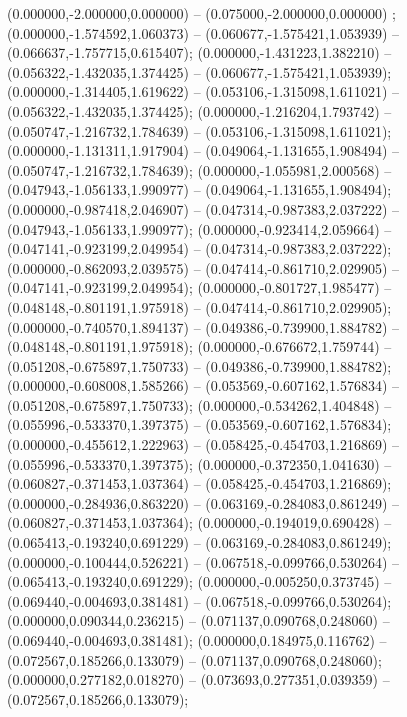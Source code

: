  (0.000000,-2.000000,0.000000) -- (0.075000,-2.000000,0.000000) ;
 (0.000000,-1.574592,1.060373) -- (0.060677,-1.575421,1.053939) -- (0.066637,-1.757715,0.615407);
 (0.000000,-1.431223,1.382210) -- (0.056322,-1.432035,1.374425) -- (0.060677,-1.575421,1.053939);
 (0.000000,-1.314405,1.619622) -- (0.053106,-1.315098,1.611021) -- (0.056322,-1.432035,1.374425);
 (0.000000,-1.216204,1.793742) -- (0.050747,-1.216732,1.784639) -- (0.053106,-1.315098,1.611021);
 (0.000000,-1.131311,1.917904) -- (0.049064,-1.131655,1.908494) -- (0.050747,-1.216732,1.784639);
 (0.000000,-1.055981,2.000568) -- (0.047943,-1.056133,1.990977) -- (0.049064,-1.131655,1.908494);
 (0.000000,-0.987418,2.046907) -- (0.047314,-0.987383,2.037222) -- (0.047943,-1.056133,1.990977);
 (0.000000,-0.923414,2.059664) -- (0.047141,-0.923199,2.049954) -- (0.047314,-0.987383,2.037222);
 (0.000000,-0.862093,2.039575) -- (0.047414,-0.861710,2.029905) -- (0.047141,-0.923199,2.049954);
 (0.000000,-0.801727,1.985477) -- (0.048148,-0.801191,1.975918) -- (0.047414,-0.861710,2.029905);
 (0.000000,-0.740570,1.894137) -- (0.049386,-0.739900,1.884782) -- (0.048148,-0.801191,1.975918);
 (0.000000,-0.676672,1.759744) -- (0.051208,-0.675897,1.750733) -- (0.049386,-0.739900,1.884782);
 (0.000000,-0.608008,1.585266) -- (0.053569,-0.607162,1.576834) -- (0.051208,-0.675897,1.750733);
 (0.000000,-0.534262,1.404848) -- (0.055996,-0.533370,1.397375) -- (0.053569,-0.607162,1.576834);
 (0.000000,-0.455612,1.222963) -- (0.058425,-0.454703,1.216869) -- (0.055996,-0.533370,1.397375);
 (0.000000,-0.372350,1.041630) -- (0.060827,-0.371453,1.037364) -- (0.058425,-0.454703,1.216869);
 (0.000000,-0.284936,0.863220) -- (0.063169,-0.284083,0.861249) -- (0.060827,-0.371453,1.037364);
 (0.000000,-0.194019,0.690428) -- (0.065413,-0.193240,0.691229) -- (0.063169,-0.284083,0.861249);
 (0.000000,-0.100444,0.526221) -- (0.067518,-0.099766,0.530264) -- (0.065413,-0.193240,0.691229);
 (0.000000,-0.005250,0.373745) -- (0.069440,-0.004693,0.381481) -- (0.067518,-0.099766,0.530264);
 (0.000000,0.090344,0.236215) -- (0.071137,0.090768,0.248060) -- (0.069440,-0.004693,0.381481);
 (0.000000,0.184975,0.116762) -- (0.072567,0.185266,0.133079) -- (0.071137,0.090768,0.248060);
 (0.000000,0.277182,0.018270) -- (0.073693,0.277351,0.039359) -- (0.072567,0.185266,0.133079);
